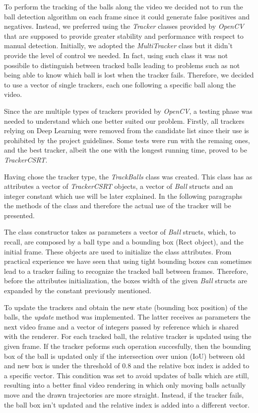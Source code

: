To perform the tracking of the balls along the video we decided not to run the ball detection algorithm on each frame since it could generate false positives and negatives.
Instead, we preferred using the \textit{Tracker} classes provided by \textit{OpenCV} that are supposed to provide greater stability and performance with respect to manual detection.
Initially, we adopted the \textit{MultiTracker} class but it didn't provide the level of control we needed. In fact, using such class it was not possibile to distinguish
between tracked balls leading to problems such as not being able to know which ball is lost when the tracker fails. Therefore, we decided to use a vector of single trackers,
each one following a specific ball along the video.

Since the are multiple types of trackers provided by \textit{OpenCV}, a testing phase was needed to understand which one better suited our problem. Firstly, all trackers
relying on Deep Learning were removed from the candidate list since their use is prohibited by the project guidelines. Some tests were run with the remaing ones, and the best tracker,
albeit the one with the longest running time, proved to be \textit{TrackerCSRT}.

Having chose the tracker type, the \textit{TrackBalls} class was created. This class has as attributes a vector of \textit{TrackerCSRT} objects, a vector of \textit{Ball} structs
and an integer constant which use will be later explained. In the following paragraphs the methods of the class and therefore the actual use of the tracker will be presented.

The class constructor takes as parameters a vector of \textit{Ball} structs, which, to recall, are composed by a ball type and a bounding box (Rect object), and the initial frame.
These objects are used to initialize the class attributes. From practical experience we have seen that using tight bounding boxes can sometimes lead to a tracker failing
to recognize the tracked ball between frames. Therefore, before the attributes initialization, the boxes width of the given \textit{Ball} structs are expanded by the constant
previously mentioned. 

To update the trackers and obtain the new state (bounding box position) of the balls, the \textit{update} method was implemented. The latter receives as parameters the next 
video frame and a vector of integers passed by reference which is shared with the renderer. For each tracked ball, the relative tracker is updated using the given frame.
If the tracker peforms such operation succesfully, then the bounding box of the ball is updated only if the intersection over union (IoU) between old and new box is under
the threshold of $0.8$ and the relative box index is added to a specific vector. This condition was set to avoid updates of balls which are still, resulting into a better final video rendering in which only moving balls actually move
and the drawn trajectories are more straight. Instead, if the tracker fails, the ball box isn't updated and the relative index is added into a different vector.

